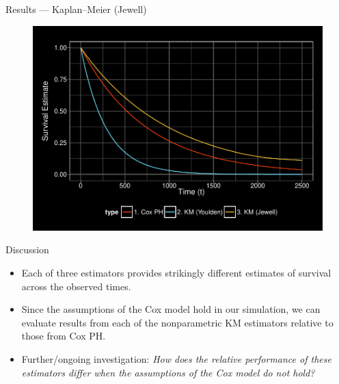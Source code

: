\documentclass[12pt,t]{beamer}
\begin{document}
\begin{frame}[c]{Results --- Kaplan--Meier (Jewell)}

\begin{center}
\begin{figure}[H]
\begin{center}
\includegraphics[width=\textwidth]{Figs/s1_cox_youlden_jewell.pdf}
\end{center}
\label{fig:s1_cox_youlden_jewll}
\end{figure}
\end{center}

\note{
}

\end{frame}


\begin{frame}[c]{Discussion}

\begin{center}
\begin{itemize}
  \itemsep12pt
  \item Each of three estimators provides strikingly different estimates of
    survival across the observed times.
  \item Since the assumptions of the Cox model hold in our simulation, we can
    evaluate results from each of the nonparametric KM estimators relative to
    those from Cox PH.
  \item Further/ongoing investigation: \textit{How does the relative performance
    of these estimators differ when the assumptions of the Cox model do not
    hold?}
\end{itemize}
\end{center}

\note{
}

\end{frame}
\end{document}
